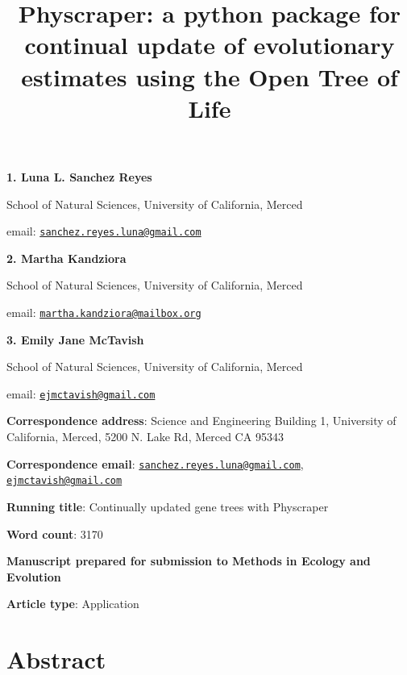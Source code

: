 \documentclass[]{article}
\title{Physcraper: a python package for continual update of evolutionary estimates using the Open Tree of Life}
\author{}
\date{\vspace{-2.5em}}
\begin{document}
\maketitle

\textbf{1. Luna L. Sanchez Reyes}

School of Natural Sciences, University of California, Merced

email: \href{mailto:sanchez.reyes.luna@gmail.com}{\nolinkurl{sanchez.reyes.luna@gmail.com}}

\textbf{2. Martha Kandziora}

School of Natural Sciences, University of California, Merced

email: \href{mailto:martha.kandziora@mailbox.org}{\nolinkurl{martha.kandziora@mailbox.org}}

\textbf{3. Emily Jane McTavish}

School of Natural Sciences, University of California, Merced

email: \href{mailto:ejmctavish@gmail.com}{\nolinkurl{ejmctavish@gmail.com}}

\textbf{Correspondence address}: Science and Engineering Building 1, University of California, Merced, 5200 N. Lake Rd, Merced CA 95343

\textbf{Correspondence email}: \href{mailto:sanchez.reyes.luna@gmail.com}{\nolinkurl{sanchez.reyes.luna@gmail.com}}, \href{mailto:ejmctavish@gmail.com}{\nolinkurl{ejmctavish@gmail.com}}

\textbf{Running title}: Continually updated gene trees with Physcraper

\textbf{Word count}: 3170

\textbf{Manuscript prepared for submission to Methods in Ecology and Evolution}

\textbf{Article type}: Application

\newpage

\hypertarget{abstract}{%
\section{Abstract}\label{abstract}}
\end{document}
